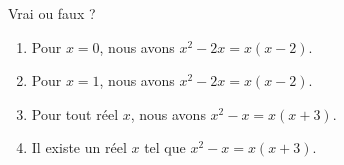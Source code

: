 
\begin{exercice}\label{exosmath-0255}

Vrai ou faux ?
    \begin{enumerate}
        \item
            Pour \( x=0\), nous avons \( x^2-2x=x(x-2)\). 
        \item
            Pour \( x=1\), nous avons \( x^2-2x=x(x-2)\). 
        \item
            Pour tout réel \( x\), nous avons \( x^2-x=x(x+3)\). 
        \item
            Il existe un réel \( x\) tel que \( x^2-x=x(x+3)\). 
    \end{enumerate}

\end{exercice}

